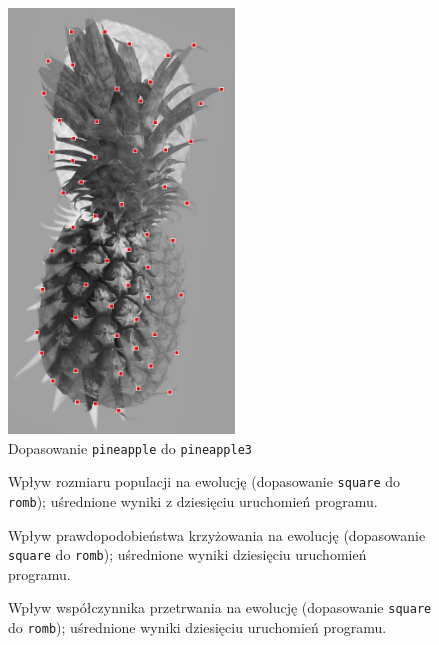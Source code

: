 \documentclass[a4paper,12pt,leqno]{article}
\begin{document}
\begin{figure}\centering
\includegraphics[width=6cm,keepaspectratio=true]{./diff_pineapple.png}
\caption{Dopasowanie \texttt{pineapple} do \texttt{pineapple3}}
\end{figure}

\begin{figure}\centering
\footnotesize\vspace{-2em}
\normalsize\caption{Wpływ rozmiaru populacji na ewolucję (dopasowanie \texttt{square} do \texttt{romb}); uśrednione wyniki z dziesięciu uruchomień programu.}
\end{figure}
\begin{figure}\centering
\footnotesize\vspace{-2em}
\normalsize\caption{Wpływ prawdopodobieństwa krzyżowania na ewolucję (dopasowanie \texttt{square} do \texttt{romb}); uśrednione wyniki dziesięciu uruchomień programu.}
\end{figure}
\begin{figure}\centering
\footnotesize\vspace{-2em}
\normalsize\caption{Wpływ współczynnika przetrwania na ewolucję (dopasowanie \texttt{square} do \texttt{romb}); uśrednione wyniki dziesięciu uruchomień programu.}
\end{figure}
\end{document}
